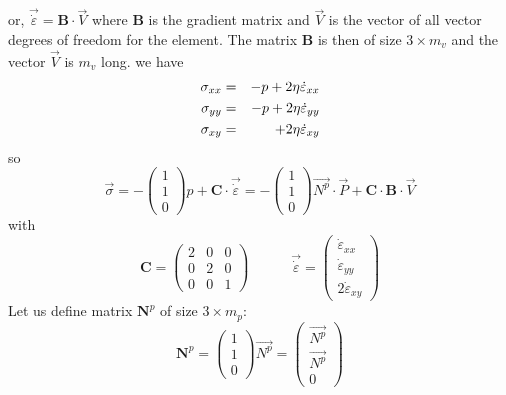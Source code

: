or, $\vec{\dot \varepsilon}={\bm B}\cdot {\vec V}$ where ${\bm B}$ is the gradient 
matrix and ${\vec V}$ is the vector of all vector degrees of freedom for the 
element. The matrix ${\bm B}$ is then of size $3\times m_v$ and the vector
${\vec V}$ is $m_v$ long.
we have 
\begin{eqnarray}
\sigma_{xx}&=&-p + 2\eta \dot\varepsilon_{xx} \\
\sigma_{yy}&=&-p + 2\eta \dot\varepsilon_{yy} \\
\sigma_{xy}&=& \hspace{5.5mm} + 2\eta \dot\varepsilon_{xy} 
\end{eqnarray}
so
\begin{equation}
\vec{\sigma} 
=-\left( 
\begin{array}{c}
1 \\ 1 \\ 0 
\end{array}
\right) p+ {\bm C} \cdot \vec{\dot\varepsilon}
=
- \left(
\begin{array}{c}
1 \\ 1 \\ 0 
\end{array}
\right)
\vec{N^p} \cdot {\vec P}  + 
{\bm C} \cdot  {\bm B}\cdot {\vec V}
\end{equation}
with
\begin{equation}
{\bm C}=
\left(
\begin{array}{ccc}
2 & 0 & 0 \\
0 & 2 & 0 \\
0 & 0 & 1  
\end{array}
\right)
\quad\quad\quad
\vec{\dot \varepsilon} = 
\left(
\begin{array}{c}
\dot \varepsilon_{xx} \\
\dot \varepsilon_{yy} \\
2\dot \varepsilon_{xy} 
\end{array}
\right)
\end{equation}
Let us define matrix ${\bm N}^p$ of size $3\times m_p$:
\begin{equation}
{\bm N}^p=
\left(
\begin{array}{c}
1 \\ 1 \\ 0
\end{array}
\right)
\vec{N^p} 
=
\left(
\begin{array}{c}
\vec{N^p} \\
\vec{N^p} \\
0
\end{array}
\right)
\end{equation}
